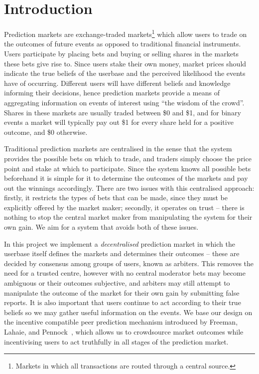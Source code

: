 \section{Introduction}

\label{sec:introduction}

Prediction markets are exchange-traded markets\footnote{Markets in which all
transactions are routed through a central source.} which allow users to trade
on the outcomes of future events as opposed to traditional financial
instruments. Users participate by placing bets and buying or selling shares in
the markets these bets give rise to. Since users stake their own money, market
prices should indicate the true beliefs of the userbase and the perceived
likelihood the events have of occurring. Different users will have different
beliefs and knowledge informing their decisions, hence prediction markets provide
a means of aggregating information on events of interest using ``the wisdom of
the crowd''. Shares in these markets are usually traded between \$0 and \$1,
and for binary events a market will typically pay out \$1 for every share held
for a positive outcome, and \$0 otherwise.

Traditional prediction markets are centralised in the sense that the system
provides the possible bets on which to trade, and traders simply choose the
price point and stake at which to participate. Since the system knows all
possible bets beforehand it is simple for it to determine the outcomes of the
markets and pay out the winnings accordingly. There are two issues with this
centralised approach: firstly, it restricts the types of bets that can be made,
since they must be explicitly offered by the market maker; secondly, it
operates on trust -- there is nothing to stop the central market maker from
manipulating the system for their own gain. We aim for a system that avoids
both of these issues.

In this project we implement a \emph{decentralised} prediction market in which
the userbase itself defines the markets and determines their outcomes -- these
are decided by consensus among groups of users, known as arbiters. This removes
the need for a trusted centre, however with no central moderator bets may
become ambiguous or their outcomes subjective, and arbiters may still attempt
to manipulate the outcome of the market for their own gain by submitting false
reports. It is also important that users continue to act according to their
true beliefs so we may gather useful information on the events. We base our
design on the incentive compatible peer prediction mechanism introduced by
Freeman, Lahaie, and Pennock~\cite{Freeman2017}, which allows us to crowdsource
market outcomes while incentivising users to act truthfully in all stages of
the prediction market.

